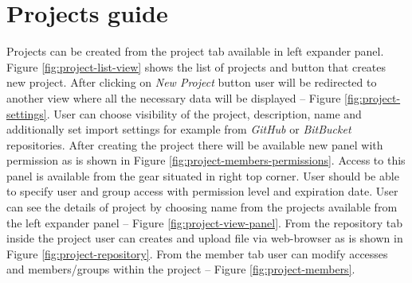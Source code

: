 \section{Projects guide} \label{s:platform-user-guide:projects}
	Projects can be created from the project tab available in left expander panel. Figure \ref{fig:project-list-view} shows the list of projects and button that creates new project. After clicking on \emph{New Project} button user will be redirected to another view where all the necessary data will be displayed -- Figure \ref{fig:project-settings}. User can choose visibility of the project, description, name and additionally set import settings for example from \emph{GitHub} or \emph{BitBucket} repositories. After creating the project there will be available new panel with permission as is shown in Figure \ref{fig:project-members-permissions}. Access to this panel is available from the gear situated in right top corner. User should be able to specify user and group access with permission level and expiration date. User can see the details of project by choosing name from the projects available from the left expander panel -- Figure \ref{fig:project-view-panel}. From the repository tab inside the project user can creates and upload file via web-browser as is shown in Figure \ref{fig:project-repository}. From the member tab user can modify accesses and members/groups within the project -- Figure \ref{fig:project-members}.
